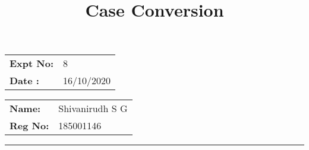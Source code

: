 \documentclass[10pt,a4paper]{article}
\title{\bf Case Conversion}
\author{\vspace{-10ex}}
\date{\vspace{-10ex}}
\begin{document}
\maketitle

\begin{minipage}{0.45\textwidth}
        \begin{tabular}{l l}
            \textbf{Expt No:}&8\\
            \textbf{Date :}&16/10/2020
        \end{tabular}
\end{minipage}%
\begin{minipage}{0.45\textwidth}
        \begin{tabular}{l l}
             \textbf{Name:}& Shivanirudh S G  \\
             \textbf{Reg No:} & 185001146 
        \end{tabular}
\end{minipage}
\vspace{1cm}
\hrule
\end{document}
